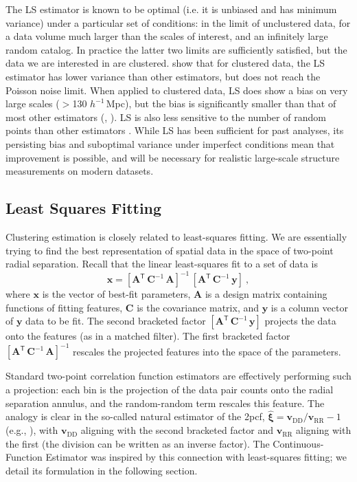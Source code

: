 \documentclass[modern]{aastex62}
\newcommand{\cf}{2pcf\xspace} %
\newcommand{\Est}{The Continuous-Function Estimator\xspace}
\newcommand{\LS}{LS\xspace}
\newcommand{\inv}{^{-1}}
\newcommand{\T}{^{\mathsf{T}}}
\newcommand{\hmpc}{$h^{-1}\,$Mpc}
\newcommand{\bld}[1]{\bm{#1}} %
\newcommand{\vv}[1]{\bld{v}_\mathrm{#1}}
\begin{document}
The \LS estimator is known to be optimal (i.e. it is unbiased and has minimum variance) under a particular set of conditions: in the limit of unclustered data, for a data volume much larger than the scales of interest, and an infinitely large random catalog. 
In practice the latter two limits are sufficiently satisfied, but the data we are interested in are clustered.
\cite{VargasMagana2013} show that for clustered data, the \LS estimator has lower variance than other estimators, but does not reach the Poisson noise limit.
When applied to clustered data, \LS does show a bias on very large scales ($>$130 \hmpc), but the bias is significantly smaller than that of most other estimators (\citealt{Kerscher1999}, \citealt{VargasMagana2013}).
\LS is also less sensitive to the number of random points than other estimators \citep{Kerscher2000}.
While \LS has been sufficient for past analyses, its persisting bias and suboptimal variance under imperfect conditions mean that improvement is possible, and will be necessary for realistic large-scale structure measurements on modern datasets.

\subsection{Least Squares Fitting}

Clustering estimation is closely related to least-squares fitting.
We are essentially trying to find the best representation of spatial data in the space of two-point radial separation.
Recall that the linear least-squares fit to a set of data is
\begin{equation}
    \label{eq:leastsq}
    \bld{x} = [\bld{A}\T\,\bld{C}\inv\,\bld{A}]\inv \, [\bld{A}\T\,\bld{C}\inv\,\bld{y}] ~,
\end{equation}
where $\bld{x}$ is the vector of best-fit parameters, $\bld{A}$ is a design matrix containing functions of fitting features, $\bld{C}$ is the covariance matrix, and $\bld{y}$ is a column vector of $\bld{y}$ data to be fit.
The second bracketed factor $[\bld{A}\T\,\bld{C}\inv\,\bld{y}]$ projects the data onto the features (as in a matched filter). 
The first bracketed factor $[\bld{A}\T\,\bld{C}\inv\,\bld{A}]\inv$ rescales the projected features into the space of the parameters.

Standard two-point correlation function estimators are effectively performing such a projection: each bin is the projection of the data pair counts onto the radial separation annulus, and the random-random term rescales this feature.
The analogy is clear in the so-called natural estimator of the \cf, $\bld{\hat{\xi}} = \vv{DD}/\vv{RR} - 1$ (e.g., \citealt{Kerscher2000}), with $\vv{DD}$ aligning with the second bracketed factor and $\vv{RR}$ aligning with the first (the division can be written as an inverse factor).
\Est was inspired by this connection with least-squares fitting; we detail its formulation in the following section.
\end{document}
